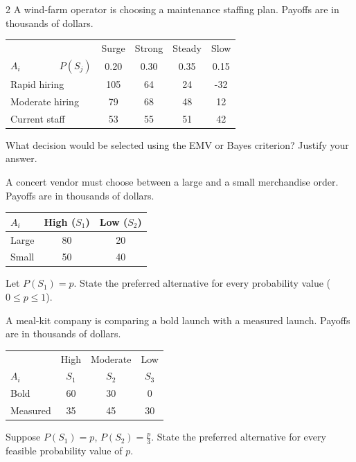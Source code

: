 \begin{multicols}{2}
		A wind-farm operator is choosing a maintenance staffing plan. Payoffs are in thousands of dollars.\vspace{-3mm}
		\begin{center}\setlength{\tabcolsep}{1.5pt}\renewcommand{\arraystretch}{1.1}
			\begin{tabular}{lcccc}\toprule
			&Surge&Strong&Steady&Slow\\
			$A_i \qquad \qquad P(S_j)$&0.20&0.30&0.35&0.15\\ \midrule
			Rapid hiring&105&64&24&-32\\
			Moderate hiring&79&68&48&12\\
			Current staff&53&55&51&42\\ \bottomrule
			\end{tabular}
		\end{center}\vspace{-3mm}
		What decision would be selected using the EMV or Bayes criterion? Justify your answer.

		A concert vendor must choose between a large and a small merchandise order. Payoffs are in thousands of dollars.\vspace{-3mm}
		\begin{center}\setlength{\tabcolsep}{4pt}\renewcommand{\arraystretch}{1.15}
			\begin{tabular}{lcc}\toprule
			$A_i$&High ($S_1$)&Low ($S_2$)\\ \midrule
			Large &80&20\\
			Small &50&40\\ \bottomrule
			\end{tabular}
		\end{center}\vspace{-2mm}
		Let $P(S_1)=p$. State the preferred alternative for every probability value ($0\le p\le1$).

		A meal-kit company is comparing a bold launch with a measured launch. Payoffs are in thousands of dollars.\vspace{-3mm}
		\begin{center}\setlength{\tabcolsep}{2pt}\renewcommand{\arraystretch}{1.1}
			\begin{tabular}{lccc}\toprule
				&High&Moderate&Low\\ 				
				$A_i$&$S_1$&$S_2$&$S_3$\\ 
				\midrule
				Bold&60&30&0\\
				Measured&35&45&30\\ \bottomrule
			\end{tabular}
		\end{center}\vspace{-3mm}
		Suppose $P(S_1)=p$, $P(S_2)=\frac{p}{3}$. State the preferred alternative for every feasible probability value of $p$.
		

\end{multicols}
